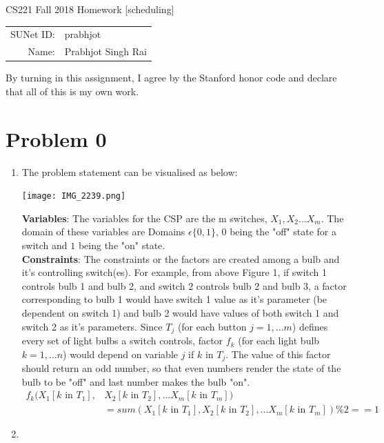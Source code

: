 \documentclass[12pt]{article}
\begin{document}
\begin{center}
{\Large CS221 Fall 2018 Homework [scheduling]}

\begin{tabular}{rl}
SUNet ID: & prabhjot \\
Name: & Prabhjot Singh Rai
\end{tabular}
\end{center}

By turning in this assignment, I agree by the Stanford honor code and declare
that all of this is my own work.

\section*{Problem 0}

\begin{enumerate}[label=(\alph*)]
  \item The problem statement can be visualised as below: \\
  \begin{center}
  \texttt{[image: IMG\_2239.png]}
  \end{center}
  \textbf{Variables}: The variables for the CSP are the m switches, $X_1, X_2 ... X_m$. The domain of these variables are Domains $   \epsilon \{0, 1\}$, $0$ being the "off" state for a switch and $1$ being the "on" state. \\
  \textbf{Constraints}: The constraints or the factors are created among a bulb and it's controlling switch(es). For example, from above Figure 1, if switch 1 controls bulb 1 and bulb 2, and switch 2 controls bulb 2 and bulb 3, a factor corresponding to bulb 1 would have switch 1 value as it's parameter (be dependent on switch 1) and bulb 2 would have values of both switch 1 and switch 2 as it's parameters. Since $T_j$ (for each button $j=1, ...m$) defines every set of light bulbs a switch controls, factor $f_k$ (for each light bulb $k=1,...n$) would depend on variable $j$ if $k$ in $T_j$. The value of this factor should return an odd number, so that even numbers render the state of the bulb to be "off" and last number makes the bulb "on".
  \begin{align*}
  f_k (X_1[\text{$k$ in $T_1$}], & X_2[\text{$k$ in $T_2$}], ... X_m[\text{$k$ in $T_m$}]) \\ & = sum(X_1[\text{$k$ in $T_1$}], X_2[\text{$k$ in $T_2$}], ... X_m[\text{$k$ in $T_m$}]) \% 2 == 1
  \end{align*}
  \item
  \begin{enumerate}[label=\roman*.]

\end{enumerate}
\end{enumerate}
\end{document}
